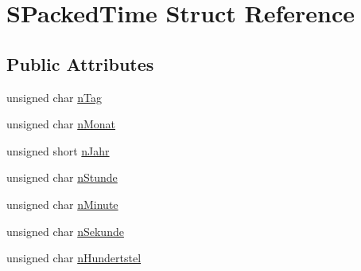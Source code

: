 \hypertarget{structSPackedTime}{\section{S\-Packed\-Time Struct Reference}
\label{structSPackedTime}
}
\subsection*{Public Attributes}
\begin{DoxyCompactItemize}
\item 
unsigned char \hyperlink{structSPackedTime_a8e166cec833b233faf6064f59979265c}{n\-Tag}
\item 
unsigned char \hyperlink{structSPackedTime_ae5a1caadb2082daa3f339093b8e3e88a}{n\-Monat}
\item 
unsigned short \hyperlink{structSPackedTime_af4d875bb5c5cc62154cf51b21a75960d}{n\-Jahr}
\item 
unsigned char \hyperlink{structSPackedTime_afdc796655d7edf2c8b37b3b7dc15e0d3}{n\-Stunde}
\item 
unsigned char \hyperlink{structSPackedTime_aebf8c14be45a04b5dfa28238e3cadf58}{n\-Minute}
\item 
unsigned char \hyperlink{structSPackedTime_af0dddb792cfd2a63d50d6b476d77c5ea}{n\-Sekunde}
\item 
unsigned char \hyperlink{structSPackedTime_af7e388034b05904596751b2ce74898fc}{n\-Hundertstel}
\end{DoxyCompactItemize}


